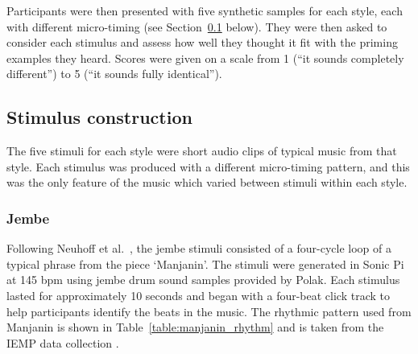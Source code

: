 \documentclass[12pt,twoside,openright]{report}
\begin{document}
Participants were then presented with five synthetic samples for each style,
each with different micro-timing (see Section~\ref{stimulus_construction} below). They were then asked to consider each stimulus and assess how
well they thought it fit with the priming examples they heard. Scores were given
on a scale from 1 (``it sounds completely different'') to 5 (``it sounds fully
identical'').


\subsection{Stimulus construction} \label{stimulus_construction}

The five stimuli for each style were short audio clips of typical music from that style. Each stimulus was produced with a different micro-timing pattern, and this was the only feature of the music which varied between stimuli within each style.

\subsubsection{Jembe} \label{jembe_stimuli}

Following Neuhoff et al.\ \cite{neuhoff2017}, the jembe stimuli consisted of a
four-cycle loop of a typical phrase from the piece `Manjanin'. The stimuli were
generated in Sonic Pi at 145 bpm using jembe drum sound samples provided by
Polak. Each stimulus lasted for approximately 10 seconds and began with a
four-beat click track to help participants identify the beats in the music. The
rhythmic pattern used from Manjanin is shown in Table~\ref{table:manjanin_rhythm} and is taken from the IEMP
data collection \cite{polak2020}.
\end{document}
